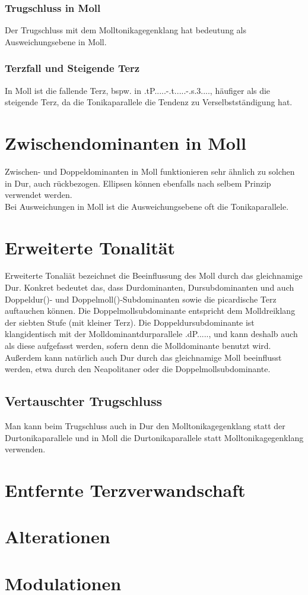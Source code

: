 \documentclass[a4paper]{article}
\newcommand{\bel}[5]{\HH.#1.#5.#2.#3.#4.}
\newcommand{\Tm}{\HH.t.....}
\newcommand{\SSm}{\HH.s.3....}
\begin{document}
	\subsubsection{Trugschluss in Moll}
	Der Trugschluss mit dem Molltonikagegenklang hat bedeutung als Ausweichungsebene in Moll.
	
	\subsubsection{Terzfall und Steigende Terz}
	In Moll ist die fallende Terz, bspw. in \bel{tP}{}{}{}{}-\Tm-\SSm, häufiger als die steigende Terz, da die Tonikaparallele die Tendenz zu Verselbstständigung hat.
	
	\section{Zwischendominanten in Moll}
	Zwischen- und Doppeldominanten in Moll funktionieren sehr ähnlich zu solchen in Dur, auch rückbezogen. Ellipsen können ebenfalls nach selbem Prinzip verwendet werden.\\ 
	Bei Ausweichungen in Moll ist die Ausweichungsebene oft die Tonikaparallele.
	
	\section{Erweiterte Tonalität}
	Erweiterte Tonaliät bezeichnet die Beeinflussung des Moll durch das gleichnamige Dur. Konkret bedeutet das, dass Durdominanten, Dursubdominanten und auch Doppeldur(\DS)- und Doppelmoll(\Ds)-Subdominanten  sowie die picardische Terz auftauchen können. Die Doppelmollsubdominante entspricht dem Molldreiklang der siebten Stufe (mit kleiner Terz). Die Doppeldursubdominante ist klangidentisch mit der Molldominantdurparallele \bel{dP}{}{}{}{}, und kann deshalb auch als diese aufgefasst werden, sofern denn die Molldominante benutzt wird.\\
	Außerdem kann natürlich auch Dur durch das gleichnamige Moll beeinflusst werden, etwa durch den Neapolitaner oder die Doppelmollsubdominante.\\
	
	\subsection{Vertauschter Trugschluss}
	Man kann beim Trugschluss auch in Dur den Molltonikagegenklang statt der Durtonikaparallele und in Moll die Durtonikaparallele statt Molltonikagegenklang verwenden. 
	
	\section{Entfernte Terzverwandschaft}
	
	
	\section{Alterationen}
	\section{Modulationen}
\end{document}
